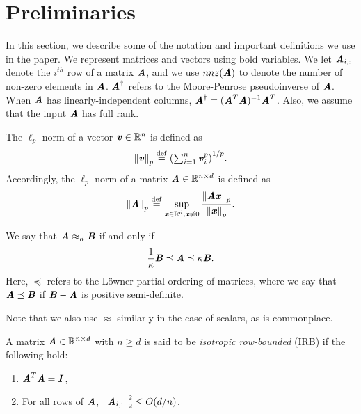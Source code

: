 \section{Preliminaries}\label{sec:prelims}

In this section, we describe some of the notation and important definitions we use in the paper. We represent matrices and vectors using bold variables. We let $\AA_{i,:}$ denote the $i^{th}$ row of a matrix $\AA$, and we use $nnz(\AA)$ to denote the number of non-zero elements in $\AA$.
$\AA^{\dagger}$ refers to the Moore-Penrose pseudoinverse of $\AA$. When $\AA$ has linearly-independent columns,
$\AA^{\dagger} = (\AA^T \AA)^{-1} \AA^T$.
Also, we assume that the input $\AA$ has full rank.


\begin{definition}
	The $\ell_p$ norm of a vector $\vv \in \R^n$
	is defined as
	\begin{align*}
	\textstyle{\norm{\vv}_p \defeq \left(\sum_{i=1}^n \vv_i^p \right)^{1/p}}.
	\end{align*} 
	Accordingly, the $\ell_p$ norm of a matrix $\AA \in \R^{n \times d}$
	is defined as
	\begin{align*}
	\norm{\AA}_p \defeq \sup_{\xx \in \R^d, \xx \neq 0} \dfrac{\norm{\AA \xx}_p}{\norm{\xx}_p}.
	\end{align*} 
\end{definition}

\begin{definition}
	We say that $\AA \approx_{\kappa} \BB$ if and only if
	\begin{align*}
	\dfrac{1}{\kappa} \BB \preceq \AA \preceq \kappa \BB.
	\end{align*}
	Here, $\preceq$ refers to the L\"{o}wner partial ordering of matrices,
	where we say that $\AA \preceq \BB$ if $\BB - \AA$ is positive semi-definite.
\end{definition}

Note that we also use $\approx$ similarly in the case of scalars, as is commonplace.

\begin{definition}[IRB]\label{def:good} A matrix $\AA \in \R^{n\times d}$ with $n \ge d$ is said to be \textit{isotropic row-bounded} (IRB) if the following hold:
	\begin{enumerate}
		\item{$\AA^T \AA = \II$},
		\item{For all rows of $\AA$, $\norme{\AA_{i,:}}^2 \leq O(d/n)$}.
	\end{enumerate}
\end{definition}

